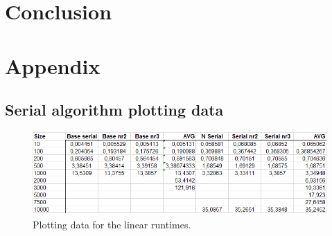\documentclass[a4paper,11pt,oneside]{book}
\begin{document}


\chapter{Conclusion}


\newpage
{}
\chapter{Appendix}
\section{Serial algorithm plotting data}

\begin{figure}[H]
  \centering
  \begin{minipage}[b]{0.9\textwidth}
    \includegraphics[width=\textwidth]{plotdata.png}
    \caption{Plotting data for the linear runtimes.}
  \end{minipage}
\end{figure}
\end{document}
